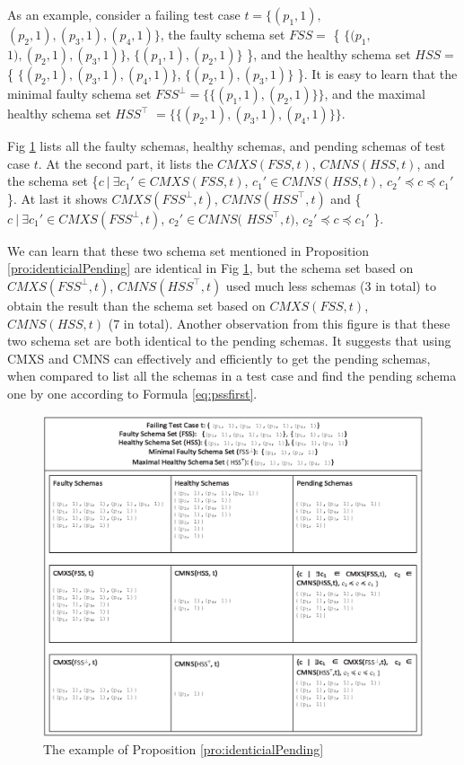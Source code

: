 \documentclass{sig-alternate-05-2015}
\begin{document}
{As an example, consider a failing test case $t = \{(p_{1}, 1),$ $ (p_{2}, 1), (p_{3}, 1), (p_{4}, 1)\}$, the faulty schema set $FSS =$ \{ $\{(p_{1}, $ $1), (p_{2}, 1), (p_{3}, 1)\}$, $\{(p_{1}, 1), (p_{2}, 1)\}$ \}, and the healthy schema set $HSS =$  \{ $\{(p_{2}, 1), (p_{3}, 1), (p_{4}, 1)\}$, $\{(p_{2}, 1), (p_{3}, 1)\}$ \}. It is easy to learn that the minimal faulty schema set $FSS^{\bot} = \{\{(p_{1}, 1), (p_{2}, 1)\}\}$, and the maximal healthy schema set $HSS^{\top}$ $= \{\{ (p_{2}, 1), (p_{3}, 1), (p_{4}, 1) \}\}$.

Fig \ref{fig_minmax} lists all the faulty schemas, healthy schemas, and pending schemas of test case $t$. At the second part, it lists the $CMXS(FSS, t)$, $CMNS(HSS, t)$, and the schema set \{$ c\ |\ \exists c_{1}' \in CMXS(FSS, t)$, $c_{1}' \in CMNS(HSS, t)$, $c_{2}' \preceq c \preceq c_{1}'$ \}. At last it shows $CMXS(FSS^{\bot}, t)$, $CMNS(HSS^{\top}, t)$ and  \{$ c\ |\ \exists c_{1}' \in CMXS(FSS^{\bot}, t)$, $ c_{2}' \in CMNS($ $HSS^{\top}, t)$, $c_{2}' \preceq c \preceq c_{1}'$ \}.

We can learn that these two schema set mentioned in Proposition \ref{pro:identicialPending} are identical in Fig \ref{fig_minmax}, but the schema set based on $CMXS(FSS^{\bot}, t)$, $CMNS(HSS^{\top}, t)$ used much less schemas (3 in total) to obtain the result than the schema set based on $CMXS(FSS, t)$, $CMNS(HSS, t)$ (7 in total). Another observation from this figure is that these two schema set are both identical to the pending schemas. It suggests that using CMXS and CMNS can effectively and efficiently to get the pending schemas, when compared to list all the schemas in a test case and find the pending schema one by one according to Formula \ref{eq:pssfirst}.

\begin{figure}[ht]
 \centering
 \includegraphics[width=7in]{minmax.eps}
 \caption{The example of Proposition \ref{pro:identicialPending}}
 \label{fig_minmax}
\end{figure}


}
\end{document}
